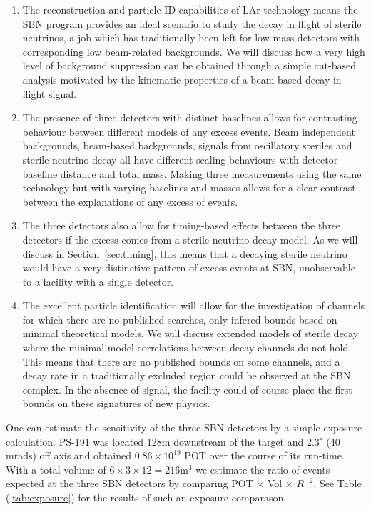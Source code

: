 \documentclass[11pt, a4paper]{article}
\newcommand{\refsec}[1]{Section~\ref{#1}}
\begin{document}
\begin{enumerate}

\item The reconstruction and particle ID capabilities of LAr technology means
the SBN program provides an ideal scenario to study the decay in flight of
sterile neutrinos, a job which has traditionally been left for low-mass
detectors with corresponding low beam-related backgrounds. 
%
We will discuss how a very high level of background suppression can be obtained
through a simple cut-based analysis motivated by the kinematic properties
of a beam-based decay-in-flight signal. 

\item The presence of three detectors with distinct baselines allows for 
contrasting behaviour between different models of any excess events. Beam 
independent backgrounds, beam-based backgrounds, signals from oscillatory 
steriles and sterile neutrino decay all have different scaling behaviours 
with detector baseline distance and total mass. Making three measurements using 
the same technology but with varying baselines and masses allows for a clear 
contrast between the explanations of any excess of events.

\item The three detectors also allow for timing-based effects between 
the three detectors if the excess comes from a sterile neutrino decay 
model. As we will discuss in \refsec{sec:timing}, this means that a decaying 
sterile neutrino would have a very distinctive pattern of excess events at
SBN, unobservable to a facility with a single detector.

\item The excellent particle identification will allow for the investigation of
channels for which there are no published searches, only infered bounds based
on minimal theoretical models. We will discuss extended models of sterile decay
where the minimal model correlations between decay channels do not hold. This
means that there are no published bounds on some channels, and a decay rate in
a traditionally excluded region could be observed at the SBN complex. In the
absence of signal, the facility could of course place the first bounds on these
signatures of new physics.\\

\end{enumerate} 

One can estimate the sensitivity of the three SBN detectors by a simple exposure calculation. PS-191 was located 128m downstream of the target and $2.3^\circ$ (40 mrads) off axis and obtained $0.86 \times 10^{19}$ POT over the course of its run-time. With a total volume of $6\times3\times12 = 216 \text{m}^3$ we estimate the ratio of events expected at the three SBN detectors by comparing POT $\times$ Vol $\times$ $R^{-2}$. See Table (\ref{tab:exposure}) for the results of such an exposure comparason.\\
\end{document}
